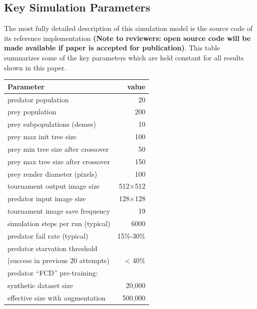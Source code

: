 \documentclass[acmtog]{acmart}
\begin{document}
\subsection{Key Simulation Parameters}
The most fully detailed description of this simulation model is the source code of its reference implementation \textbf{(Note to reviewers: open source code will be made available if paper is accepted for publication)}. This table summarizes some of the key parameters which are held constant for all results shown in this paper.
\par

\begin{adjustwidth}{1cm}{0cm}
    \vspace{0.3cm}
    \begin{tabular}{ |l|r| }
        \hline
        \textbf{Parameter} & \textbf{value} \\ 
        \hline
        predator population & 20 \\ 
        prey population & 200 \\ 
        prey subpopulations (demes) & 10 \\
        prey max init tree size & 100 \\
        prey min tree size after crossover & 50 \\
        prey max tree size after crossover & 150 \\
        \hline
        prey render diameter (pixels) & 100 \\ 
        tournament output image size & 512×512 \\ 
        predator input image size & 128×128 \\ 
        \hline
        tournament image save frequency & 19 \\
        simulation steps per run (typical) & 6000 \\
        predator fail rate (typical) & 15\%-30\% \\
        predator starvation threshold & \\
        \hspace{0.2cm}(success in previous 20 attempts) & < 40\% \\ 
        \hline
        predator “FCD” pre-training: & \\
        \hspace{0.2cm} synthetic dataset size & 20,000 \\
        \hspace{0.2cm} effective size with augmentation & 500,000 \\
        \hline
    \end{tabular}
\end{adjustwidth}
\end{document}
